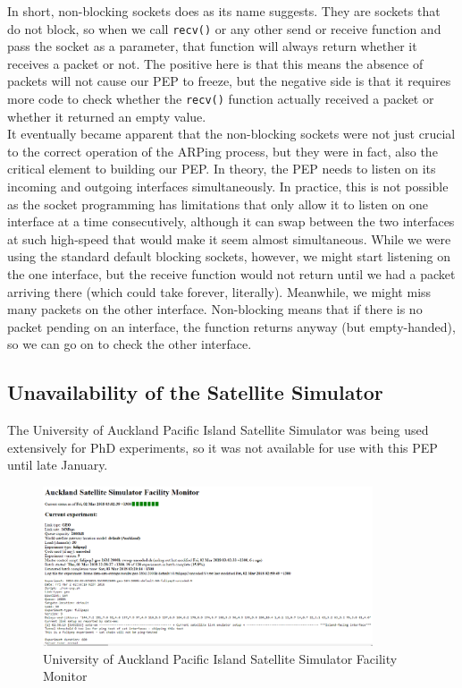 \begin{appendices}
In short, non-blocking sockets does as its name suggests. They are sockets that do not block, so when we call {\tt recv()} or any other send or receive function and pass the socket as a parameter, that function will always return whether it receives a packet or not. The positive here is that this means the absence of packets will not cause our PEP to freeze, but the negative side is that it requires more code to check whether the {\tt recv()} function actually received a packet or whether it returned an empty value. \\

It eventually became apparent that the non-blocking sockets were not just crucial to the correct operation of the ARPing process, but they were in fact, also the critical element to building our PEP. In theory, the PEP needs to listen on its incoming and outgoing interfaces simultaneously. In practice, this is not possible as the socket programming has limitations that only allow it to listen on one interface at a time consecutively, although it can swap between the two interfaces at such high-speed that would make it seem almost simultaneous. While we were using the standard default blocking sockets, however, we might start listening on the one interface, but the receive function would not return until we had a packet arriving there (which could take forever, literally). Meanwhile, we might miss many packets on the other interface. Non-blocking means that if there is no packet pending on an interface, the function returns anyway (but empty-handed), so we can go on to check the other interface.

\subsection{Unavailability of the Satellite Simulator}

The University of Auckland Pacific Island Satellite Simulator was being used extensively for PhD experiments, so it was not available for use with this PEP until late January. 

\begin{figure}[h!]
    \centering
    \includegraphics[width=0.87\textwidth]{experiment.PNG}
    \caption{University of Auckland Pacific Island Satellite Simulator Facility Monitor}
    \label{fig: experiment} 
\end{figure}


\end{appendices}
